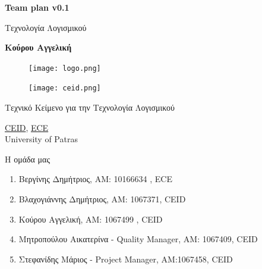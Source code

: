 \documentclass{article}
\begin{document}
\begin{titlepage}
   \begin{center}
       \vspace*{1cm}

       \textbf{\huge Team plan v0.1}

       \vspace{0.5cm}
        Τεχνολογία Λογισμικού
            
       \vspace{1cm}

       \textbf{Κούρου Αγγελική}
       
       \begin{figure}[!htb]
        \centering
        \texttt{[image: logo.png]}
        \end{figure}
        
        \vspace{0.5cm}
        
        \begin{figure}[!htb]
        \centering
        \texttt{[image: ceid.png]}
        \end{figure}


       \vfill
            
       Τεχνικό Κείμενο για την Τεχνολογία Λογισμικού\\
            
       \vspace{0.5cm}
            
        \href{http://www.ceid.upatras.gr}{CEID}, \href{http://www.ece.upatras.gr}{ECE} \\
       University of Patras\\
            
   \end{center}
\end{titlepage}



\noindent Η ομάδα μας

\begin{enumerate}
  \item Βεργίνης Δημήτριος, ΑΜ: 10166634 , ECE
  \item Βλαχογιάννης Δημήτριος, ΑΜ: 1067371, CEID
  \item Κούρου Αγγελική, ΑΜ: 1067499 , CEID
  \item Μητροπούλου Αικατερίνα - Quality Manager, ΑΜ: 1067409, CEID
  \item Στεφανίδης Μάριος - Project Manager, ΑΜ:1067458, CEID
\end{enumerate}
\end{document}
